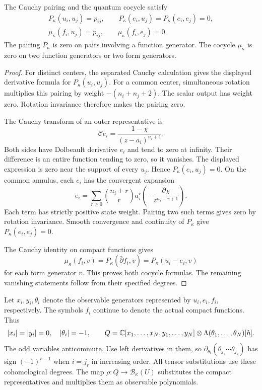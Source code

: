 \begin{lemma}
\label{lem:bf-compact-representative-pairings}
The Cauchy pairing and the quantum cocycle satisfy
\[
 \begin{gathered}
 P_\kappa(u_i,u_j)=p_{ij},\qquad
 P_\kappa(e_i,u_j)=P_\kappa(e_i,e_j)=0,\\
 \mu_\kappa(f_i,u_j)=p_{ij},\qquad
 \mu_\kappa(f_i,e_j)=0.
 \end{gathered}
\]
The pairing $P_\kappa$ is zero on pairs involving a function generator.
The cocycle $\mu_\kappa$ is zero on two function generators or two
form generators.
\end{lemma}
\begin{proof}
For distinct centers, the separated Cauchy calculation gives the
displayed derivative formula for $P_\kappa(u_i,u_j)$.
For a common center, simultaneous rotation multiplies this pairing
by weight $-(n_i+n_j+2)$.  The scalar output has weight zero.
Rotation invariance therefore makes the pairing zero.

The Cauchy transform of an outer representative is
\[
 \mathscr C e_i=\frac{1-\chi}{(z-a_i)^{n_i+1}}.
\]
Both sides have Dolbeault derivative $e_i$ and tend to zero at
infinity.  Their difference is an entire function tending to zero,
so it vanishes.  The displayed expression is zero near the support
of every $u_j$.  Hence $P_\kappa(e_i,u_j)=0$.
On the common annulus, each $e_i$ has the convergent expansion
\[
 e_i=\sum_{r\ge0}\binom{n_i+r}{r}a_i^r
            \left(-\frac{\bar\partial\chi}{z^{n_i+r+1}}\right).
\]
Each term has strictly positive state weight.  Pairing two such
terms gives zero by rotation invariance.  Smooth convergence and
continuity of $P_\kappa$ give $P_\kappa(e_i,e_j)=0$.

The Cauchy identity on compact functions gives
\[
 \mu_\kappa(f_i,v)=P_\kappa(\bar\partial f_i,v)
                 =P_\kappa(u_i-e_i,v)
\]
for each form generator $v$.  This proves both cocycle formulas.
The remaining vanishing statements follow from their specified degrees.
\end{proof}

Let $x_i,y_i,\theta_i$ denote the observable generators represented
by $u_i,e_i,f_i$, respectively.  The symbols $f_i$ continue to denote
the actual compact functions.  Thus
\[
 |x_i|=|y_i|=0,\quad |\theta_i|=-1,\qquad
 Q=\mathbb C[x_1,\ldots,x_N,y_1,\ldots,y_N]
              \otimes\Lambda(\theta_1,\ldots,\theta_N)[\hbar].
\]
The odd variables anticommute.  Use left derivatives in them, so
$\partial_{\theta_i}(\theta_{j_1}\cdots\theta_{j_s})$
has sign $(-1)^{r-1}$ when $i=j_r$ in increasing order.
All tensor substitutions use these cohomological degrees.
The map $\rho:Q\to\mathcal B_\kappa(U)$ substitutes the compact
representatives and multiplies them as observable polynomials.

